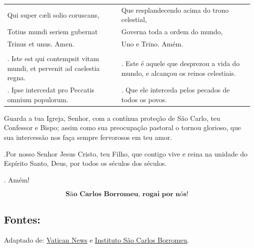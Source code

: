 \documentclass[a4paper,14pt]{extarticle} \usepackage[utf8]{inputenc}
\makeatletter
\newcommand{\vers@resp@sym}{%
  \raisebox{0.2ex}{\rotatebox[origin=c]{-20}{$\m@th\rceil$}}%
}
\newcommand{\vers@resp}[2]{%
  {\ooalign{%
     \hidewidth\kern#1\vers@resp@sym\hidewidth\cr
     #2\cr
  }}%
}
\DeclareRobustCommand{\versicle}{\vers@resp{-0.1em}{V}}
\DeclareRobustCommand{\response}{\vers@resp{0pt}{R}}
\makeatother
\begin{document}
\begin{center}
\begin{longtable}{p{}|p{}}
Qui super c\ae{}li solio coruscans, & Que resplandecendo acima do trono celestial, \\
Totius mundi seriem gubernat & Governa toda a ordem do mundo, \\
Trinus et unus. Amen. & Uno e Trino. Amém. \\
& \\
\versicle. Iste est qui contempsit vitam mundi, et pervenit ad caelestia regna. & \versicle. Este é aquele que desprezou a vida do mundo, e alcançou os reinos celestiais. \\
\response. Ipse intercedat pro Peccatis omnium populorum. & \response. Que ele interceda pelos pecados de todos os povos. \\
\hline
\end{longtable}
\end{center}


 Guarda a tua Igreja, Senhor, com a contínua proteção de São Carlo, teu Confessor e Bispo; assim como sua preocupação pastoral o tornou glorioso, que sua intercessão nos faça sempre fervorosos em teu amor.

\versicle.Por nosso Senhor Jesus Cristo, teu Filho, que contigo vive e reina na unidade do Espírito Santo, Deus, por todos os séculos dos séculos.

\response. Amém!

\[
  \textbf{São Carlos Borromeu, rogai por nós!}
\]

\vfill

\begin{center}
\subsection*{Fontes:}
Adaptado de: \underline{\href{https://www.vaticannews.va/pt/santo-do-dia/11/04/s--carlos-borromeu--arcebispo-de-milao-e-cardeal.html}{Vatican News}} e \underline{\href{https://institutosaocarlos.com.br/novena-para-a-honra-e-gloria-de-sao-carlos-borromeu/}{Instituto São Carlos Borromeu}}.
\end{center}
\end{document}
